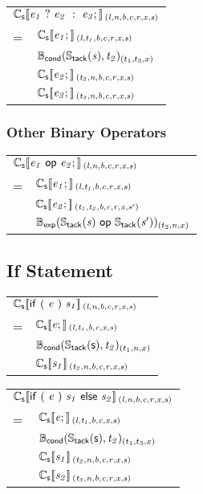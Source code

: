\documentclass[a4j]{jsarticle}
\newcommand{\lb}{[\![}				%
\newcommand{\rb}{]\!]}				%
\newcommand{\db}[1]{\lb#1\rb}			%
\newcommand{\den}[2]{{#1}\db{#2}\,}
\newcommand{\defC}[3]{\den{#1}{\sf #2}_{\it #3}}
\newcommand{\Cs}{\defC{\mathbb{C}_{\sf s}}}
\newcommand{\Stack}[1]{\mathbb{S}_{\sf tack}(#1)}
\newcommand{\defB}[3]{{#1}({\sf #2})_{#3}}
\newcommand{\Bexp}{\defB{\mathbb{B}_{\sf exp}}}
\newcommand{\Bcond}{\defB{\mathbb{B}_{\sf cond}}}
\newcommand{\var}[1]{{\it #1}}
\begin{document}
\vspace{1em}

\begin{tabular}{ll}
	\multicolumn{2}{l}{
		$ \Cs{ \var{e_1}\ ?\ \var{e_2}\ :\ \var{e_3}; }{(l, n, b, c, r, x, s)} $
	}  \\
	=   &  $ \Cs{ \var{e_1}; }{(l, t_1, b, c, r, x, s)}          $  \\
	    &  $ \Bcond{ \Stack{\var{s}}, \var{t_2} }{(t_1, t_3, x)} $  \\
	    &  $ \Cs{ \var{e_2}; }{(t_2, n, b, c, r, x, s)}          $  \\
	    &  $ \Cs{ \var{e_3}; }{(t_3, n, b, c, r, x, s)}          $
\end{tabular}


\subsubsection{Other Binary Operators}

\begin{tabular}{ll}
	\multicolumn{2}{l}{
		$ \Cs{ \var{e_1}\ op\ \var{e_2}; }{(l, n, b, c, r, x, s)} $
	}  \\
	=   &  $ \Cs{ \var{e_1}; }{(l  , t_1, b, c, r, x, s)}                $  \\
	    &  $ \Cs{ \var{e_2}; }{(t_1, t_2, b, c, r, x, s')}               $  \\
	    &  $ \Bexp{ \Stack{\var{s}}\ op\ \Stack{\var{s'}} }{(t_2, n, x)} $
\end{tabular}



\subsection{If Statement}

\begin{tabular}{ll}
\multicolumn{2}{l}{
	$ \Cs{ if\ (\ \var{e}\ )\ \var{s_1} }{(l, n, b, c, r, x, s)} $
}  \\
=  &  $ \Cs{ \var{e}; }{(l, t_1, b, c, x, s)}          $ \\
   &  $ \Bcond{ \Stack{s}, \var{t_2} }{(t_1, n, x)} $ \\
   &  $ \Cs{ \var{s_1} }{(t_2, n, b, c, r, x, s)}        $
\end{tabular}

\vspace{1em}

\begin{tabular}{ll}
\multicolumn{2}{l}{
	$ \Cs{ if\ (\ \var{e}\ )\ \var{s_1}\ else\ \var{s_2} }{(l, n, b, c, r, x, s)} $
}  \\
=  &  $ \Cs{ \var{e}; }{(l, t_1, b, c, x, s)}         $ \\
   &  $ \Bcond{ \Stack{s}, \var{t_2} }{(t_1, t_3, x)} $ \\
   &  $ \Cs{ \var{s_1} }{(t_2, n, b, c, r, x, s)}     $ \\
   &  $ \Cs{ \var{s_2} }{(t_3, n, b, c, r, x, s)}     $
\end{tabular}
\end{document}
